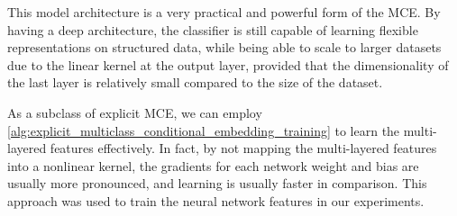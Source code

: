 \documentclass[runningheads, envcountsame, a4paper]{llncs}
\begin{document}
			This model architecture is a very practical and powerful form of the \gls{MCE}. By having a deep architecture, the classifier is still capable of learning flexible representations on structured data, while being able to scale to larger datasets due to the linear kernel at the output layer, provided that the dimensionality of the last layer is relatively small compared to the size of the dataset.
			
			As a subclass of explicit \gls{MCE}, we can employ \cref{alg:explicit_multiclass_conditional_embedding_training} to learn the multi-layered features effectively. In fact, by not mapping the multi-layered features into a nonlinear kernel, the gradients for each network weight and bias are usually more pronounced, and learning is usually faster in comparison. This approach was used to train the neural network features in our experiments.
\end{document}
